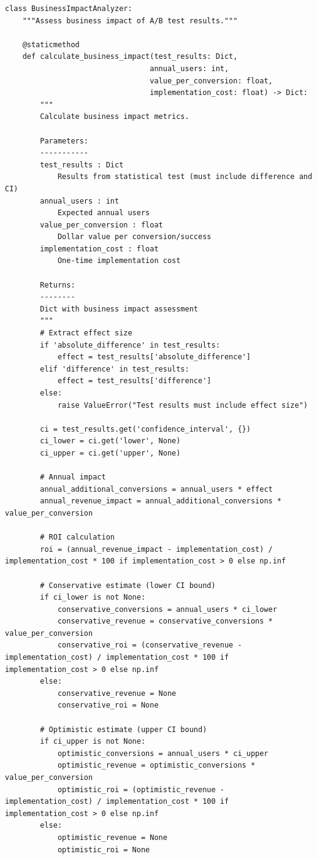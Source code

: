 \lstset{language=Python, caption=Business Impact Assessment}
\begin{lstlisting}
class BusinessImpactAnalyzer:
    """Assess business impact of A/B test results."""

    @staticmethod
    def calculate_business_impact(test_results: Dict,
                                 annual_users: int,
                                 value_per_conversion: float,
                                 implementation_cost: float) -> Dict:
        """
        Calculate business impact metrics.

        Parameters:
        -----------
        test_results : Dict
            Results from statistical test (must include difference and CI)
        annual_users : int
            Expected annual users
        value_per_conversion : float
            Dollar value per conversion/success
        implementation_cost : float
            One-time implementation cost

        Returns:
        --------
        Dict with business impact assessment
        """
        # Extract effect size
        if 'absolute_difference' in test_results:
            effect = test_results['absolute_difference']
        elif 'difference' in test_results:
            effect = test_results['difference']
        else:
            raise ValueError("Test results must include effect size")

        ci = test_results.get('confidence_interval', {})
        ci_lower = ci.get('lower', None)
        ci_upper = ci.get('upper', None)

        # Annual impact
        annual_additional_conversions = annual_users * effect
        annual_revenue_impact = annual_additional_conversions * value_per_conversion

        # ROI calculation
        roi = (annual_revenue_impact - implementation_cost) / implementation_cost * 100 if implementation_cost > 0 else np.inf

        # Conservative estimate (lower CI bound)
        if ci_lower is not None:
            conservative_conversions = annual_users * ci_lower
            conservative_revenue = conservative_conversions * value_per_conversion
            conservative_roi = (conservative_revenue - implementation_cost) / implementation_cost * 100 if implementation_cost > 0 else np.inf
        else:
            conservative_revenue = None
            conservative_roi = None

        # Optimistic estimate (upper CI bound)
        if ci_upper is not None:
            optimistic_conversions = annual_users * ci_upper
            optimistic_revenue = optimistic_conversions * value_per_conversion
            optimistic_roi = (optimistic_revenue - implementation_cost) / implementation_cost * 100 if implementation_cost > 0 else np.inf
        else:
            optimistic_revenue = None
            optimistic_roi = None


\end{lstlisting}
